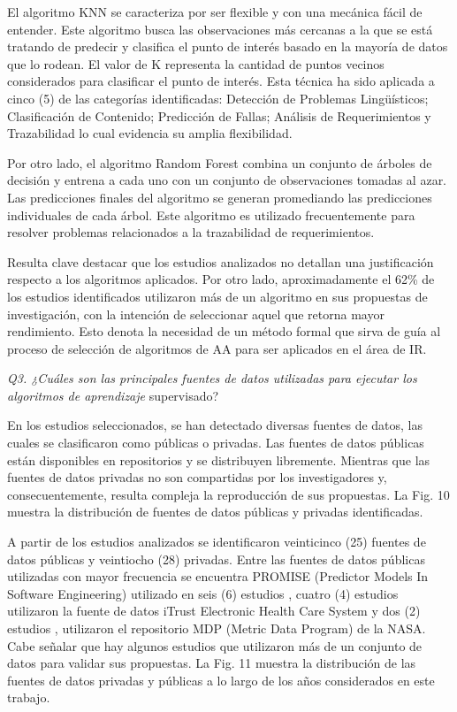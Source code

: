 \documentclass[journal]{IEEEtran}
\begin{document}
El algoritmo KNN se caracteriza por ser flexible y con una mecánica fácil de entender. Este algoritmo busca las observaciones más cercanas a la que se está tratando de predecir y clasifica el punto de interés basado en la mayoría de datos que lo rodean. El valor de K representa la cantidad de puntos vecinos considerados para clasificar el punto de interés. Esta técnica ha sido aplicada a cinco (5) de las categorías identificadas: Detección de Problemas Lingüísticos; Clasificación de Contenido; Predicción de Fallas; Análisis de Requerimientos y Trazabilidad lo cual evidencia su amplia flexibilidad.

Por otro lado, el algoritmo Random Forest combina un conjunto de árboles de decisión y entrena a cada uno con un conjunto de observaciones tomadas al azar. Las predicciones finales del algoritmo se generan promediando las predicciones individuales de cada árbol. Este algoritmo es utilizado frecuentemente para resolver problemas relacionados a la trazabilidad de requerimientos. 

Resulta clave destacar que los estudios analizados no detallan una justificación respecto a los algoritmos aplicados. Por otro lado, aproximadamente el 62\% de los estudios identificados utilizaron más de un algoritmo en sus propuestas de investigación, con la intención de seleccionar aquel que retorna mayor rendimiento. Esto denota la necesidad de un método formal que sirva de guía al proceso de selección de algoritmos de AA para ser aplicados en el área de IR.

\emph{Q3. ¿Cuáles son las principales fuentes de datos utilizadas para ejecutar los algoritmos de aprendizaje} supervisado?

En los estudios seleccionados, se han detectado diversas fuentes de datos, las cuales se clasificaron como públicas o privadas. Las fuentes de datos públicas están disponibles en repositorios y se distribuyen libremente. Mientras que las fuentes de datos privadas no son compartidas por los investigadores y, consecuentemente, resulta compleja la reproducción de sus propuestas. La Fig. 10 muestra la distribución de fuentes de datos públicas y privadas identificadas.

A partir de los estudios analizados se identificaron veinticinco (25) fuentes de datos públicas y veintiocho (28) privadas. Entre las fuentes de datos públicas utilizadas con mayor frecuencia se encuentra PROMISE (Predictor Models In Software Engineering) utilizado en seis (6) estudios \cite{Jindal20162027,dekhtyar2017re,abad2017works,Slankas2013,fitzgerald2012early,malhotra2017exploratory}, cuatro (4) estudios utilizaron la fuente de datos iTrust Electronic Health Care System \cite{Slankas2013,Slankas2013a,winkler2016automatic,sharma2014automated} y dos (2) estudios \cite{fitzgerald2012early}, \cite{malhotra2017exploratory} utilizaron el repositorio MDP (Metric Data Program) de la NASA. Cabe señalar que hay algunos estudios que utilizaron más de un conjunto de datos para validar sus propuestas. La Fig. 11 muestra la distribución de las fuentes de datos privadas y públicas a lo largo de los años considerados en este trabajo.
\end{document}
